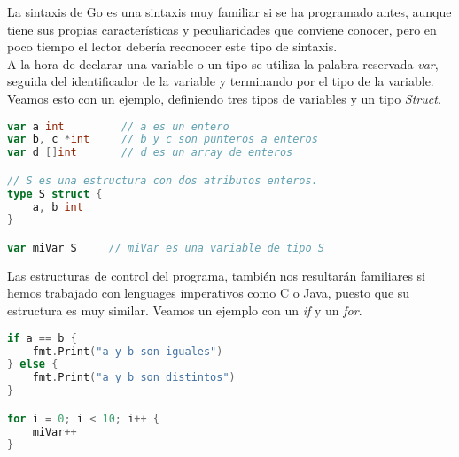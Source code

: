 La sintaxis de Go es una sintaxis muy familiar si se ha programado antes, aunque
tiene sus propias características y peculiaridades que conviene conocer, pero en
poco tiempo el lector debería reconocer este tipo de sintaxis.\\

A la hora de declarar una variable o un tipo se utiliza la palabra reservada
\emph{var}, seguida del identificador de la variable y terminando por el tipo de
la variable.\\

Veamos esto con un ejemplo, definiendo tres tipos de variables y un tipo \emph{Struct}.

\begin{minipage}{17.1cm}
\begin{lstlisting}[language=go,numbers=none]
var a int         // a es un entero
var b, c *int     // b y c son punteros a enteros
var d []int       // d es un array de enteros

// S es una estructura con dos atributos enteros.
type S struct {
    a, b int
}

var miVar S 	// miVar es una variable de tipo S
\end{lstlisting}
\end{minipage}

Las estructuras de control del programa, también nos resultarán familiares si
hemos trabajado con lenguages imperativos como C o Java, puesto que su
estructura es muy similar. Veamos un ejemplo con un \emph{if} y un \emph{for}.

\begin{minipage}{17.1cm}
\begin{lstlisting}[language=go,numbers=none]
if a == b {
    fmt.Print("a y b son iguales")
} else {
    fmt.Print("a y b son distintos")
}

for i = 0; i < 10; i++ {
	miVar++
}
\end{lstlisting}
\end{minipage}


